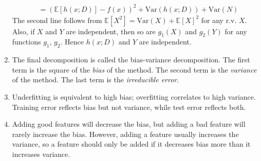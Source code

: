 \documentclass[10pt]{article}
\begin{document}
\begin{multicols}{2}
\begin{addmargin}[0.8em]{0.5em}
\begin{enumerate}[label=(\alph*)]
\begin{align*}
        &= \left( \mathbb{E} \left[ h(x;D) \right] - f(x) \right)^2 + \text{Var}(h(x;D)) + \text{Var}(N)
        \end{align*}
        The second line follows from $\mathbb{E}[X^2] = \text{Var}(X)+ \mathbb{E}[X]^2$ for any r.v. $X$. Also, if $X$ and $Y$ are independent, then so are $g_1(X)$ and $g_2(Y)$ for any functions $g_1$, $g_2$. Hence $h(x;D)$ and $Y$ are independent.
        \item The final decomposition is called the bias-variance decomposition. The first term is the square of the \textit{bias} of the method. The second term is the \textit{variance} of the method. The last term is the \textit{irreducible error}.
        \item Underfitting is equivalent to high bias; overfitting correlates to high variance. Training error reflects bias but not variance, while test error reflects both. 
        \item Adding good features will decrease the bias, but adding a bad feature will rarely increase the bias. However, adding a feature usually increases the variance, so a feature should only be added if it decreases bias more than it increases variance.
    \end{enumerate}
    

\end{addmargin}
\end{multicols}
\end{document}
